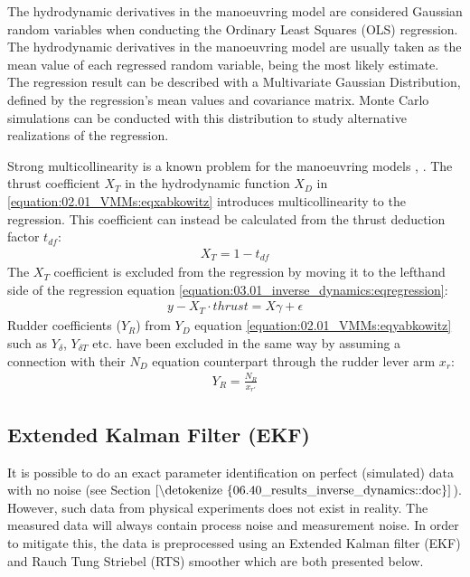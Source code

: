 \documentclass[review]{elsarticle}
\begin{document}
\sphinxAtStartPar
The hydrodynamic derivatives in the manoeuvring model are considered Gaussian random variables when conducting the Ordinary Least Squares (OLS) regression. The hydrodynamic derivatives in the manoeuvring model are usually taken as the mean value of each regressed random variable, being the most likely estimate. The regression result can be described with a Multivariate Gaussian Distribution, defined by the regression’s mean values and covariance matrix. Monte Carlo simulations can be conducted with this distribution to study alternative realizations of the regression.

\sphinxAtStartPar
Strong multicollinearity is a known problem for the manoeuvring models \cite{luo_parameter_2016}, \cite{wang_quantifying_2018}.
The thrust coefficient \(X_T\) in the hydrodynamic function \(X_D\) in \autoref{equation:02.01_VMMs:eqxabkowitz} introduces multicollinearity to the regression. This coefficient can instead be calculated from the thrust deduction factor \(t_{df}\):
\begin{equation}\label{equation:03.01_inverse_dynamics:eqXthrust}
\begin{split}\displaystyle X_{T} = 1 - t_{df}\end{split}
\end{equation}
\sphinxAtStartPar
The \(X_T\) coefficient is excluded from the regression by moving it to the left\sphinxhyphen{}hand side of the regression equation \autoref{equation:03.01_inverse_dynamics:eqregression}:
\begin{equation}\label{equation:03.01_inverse_dynamics:eqexclude}
\begin{split}y-X_T \cdot thrust = X \gamma + \epsilon\end{split}
\end{equation}
\sphinxAtStartPar
Rudder coefficients (\(Y_R\)) from \(Y_D\) equation \autoref{equation:02.01_VMMs:eqyabkowitz} such as \(Y_{\delta}\), \(Y_{\delta T}\) etc. have been excluded in the same way by assuming a connection with their \(N_D\) equation counterpart through the rudder lever arm \(x_r\):
\begin{equation}\label{equation:03.01_inverse_dynamics:eqyr}
\begin{split}\displaystyle Y_{R} = \frac{N_{R}}{x_{r'}}\end{split}
\end{equation}

\subsection{Extended Kalman Filter (EKF)}
\label{\detokenize{04.01_EK:extended-kalman-filter-ekf}}\label{\detokenize{04.01_EK::doc}}
\sphinxAtStartPar
It is possible to do an exact parameter identification on perfect (simulated) data with no noise (see Section \(\ref{\detokenize{06.40_results_inverse_dynamics::doc}}\)). However, such data from physical experiments does not exist in reality. The measured data will always contain process noise and measurement noise. In order to mitigate this, the data is preprocessed using an Extended Kalman filter (EKF) and Rauch Tung Striebel (RTS) smoother which are both presented below.
\end{document}
